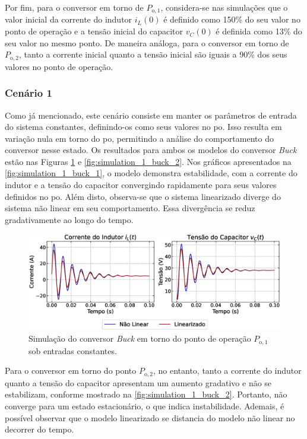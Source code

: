 Por fim, para o conversor em torno de $P_{\mathrm{o}, 1}$, considera-se nas simulações que o valor inicial da corrente do indutor $i_L(0)$ é definido como 150\% do seu valor no ponto de operação e a tensão inicial do capacitor $v_C(0)$ é definida como 13\% do seu valor no mesmo ponto. De maneira análoga, para o conversor em torno de $P_{\mathrm{o}, 2}$, tanto a corrente inicial quanto a tensão inicial são iguais a 90\% dos seus valores no ponto de operação.

\subsubsection{Cenário 1}

Como já mencionado, este cenário consiste em manter os parâmetros de entrada do sistema constantes, definindo-os como seus valores no \acrshort{po}. Isso resulta em variação nula em torno do \acrshort{po}, permitindo a análise do comportamento do conversor nesse estado. Os resultados para ambos os modelos do conversor \textit{Buck} estão nas Figuras \ref{fig:simulation_1_buck_1} e \ref{fig:simulation_1_buck_2}. Nos gráficos apresentados na \autoref{fig:simulation_1_buck_1}, o modelo demonstra estabilidade, com a corrente do indutor e a tensão do capacitor convergindo rapidamente para seus valores definidos no \acrshort{po}. Além disto, observa-se que o sistema linearizado diverge do sistema não linear em seu comportamento. Essa divergência se reduz gradativamente ao longo do tempo.

\begin{figure}[H]
  \centering
  \captionsetup{justification=centering}
  \includegraphics[width=1.\textwidth]{figuras/buck/sim1/op1/result.eps}
  \caption{Simulação do conversor \textit{Buck} em torno do ponto de operação $P_{\mathrm{o}, 1}$ sob entradas constantes.}
  \label{fig:simulation_1_buck_1}
\end{figure}

Para o conversor em torno do ponto $P_{\mathrm{o}, 2}$, no entanto, tanto a corrente do indutor quanto a tensão do capacitor apresentam um aumento gradativo e não se estabilizam, conforme mostrado na \autoref{fig:simulation_1_buck_2}. Portanto, não converge para um estado estacionário, o que indica instabilidade. Ademais, é possível observar que o modelo linearizado se distancia do modelo não linear no decorrer do tempo.

